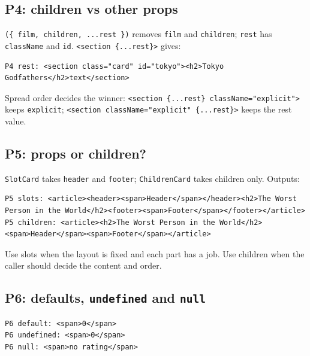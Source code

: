 \documentclass[
  11pt,
]{article}
\begin{document}
\subsection{P4: children vs other
props}\label{p4-children-vs-other-props}

\texttt{(\{ film, children, ...rest \})} removes
\texttt{film} and \texttt{children};
\texttt{rest} has \texttt{className}
and \texttt{id}.
\texttt{\textless{}section \{...rest\}\textgreater{}} gives:

\begin{lstlisting}
P4 rest: <section class="card" id="tokyo"><h2>Tokyo Godfathers</h2>text</section>
\end{lstlisting}

Spread order decides the winner:
\texttt{\textless{}section \{...rest\} className="explicit"\textgreater{}}
keeps \texttt{explicit};
\texttt{\textless{}section className="explicit" \{...rest\}\textgreater{}}
keeps the rest value.

\subsection{P5: props or children?}\label{p5-props-or-children}

\texttt{SlotCard} takes
\texttt{header} and \texttt{footer};
\texttt{ChildrenCard} takes children only. Outputs:

\begin{lstlisting}
P5 slots: <article><header><span>Header</span></header><h2>The Worst Person in the World</h2><footer><span>Footer</span></footer></article>
P5 children: <article><h2>The Worst Person in the World</h2><span>Header</span><span>Footer</span></article>
\end{lstlisting}

Use slots when the layout is fixed and each part has a job. Use children
when the caller should decide the content and order.

\subsection{\texorpdfstring{P6: defaults, \texttt{undefined} and
\texttt{null}}{P6: defaults, undefined and null}}\label{p6-defaults-undefined-and-null}

\begin{lstlisting}
P6 default: <span>0</span>
P6 undefined: <span>0</span>
P6 null: <span>no rating</span>
\end{lstlisting}
\end{document}
